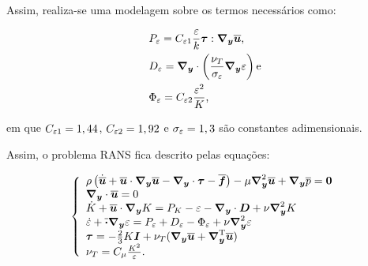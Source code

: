 Assim, realiza-se uma modelagem sobre os termos necessários como:

\begin{subequations}
    \begin{align}
         & P_\ep=C_{\ep 1}\frac{\ep}{k}\btau:\Ny\BBB{u}\text{,}          \\
         & D_\ep=\Ny\cdot\bigpar{\frac{\nu_T}{\sigma_\ep}\Ny\ep}\text{e} \\
         & \Phi_\ep=C_{\ep 2}\frac{\ep^2}{K}\text{,}
    \end{align}
\end{subequations}

\noindent em que $C_{\ep 1}=1,44$, $C_{\ep 2}=1,92$ e $\sigma_\ep=1,3$ são constantes adimensionais.

Assim, o problema RANS fica descrito pelas equações:

\begin{equation}
    \left\{
    \begin{array}{l}
        \rho\bigpar{\dot{\BBB{u}}+\BBB{u}\cdot\Ny\BBB{u}-\Ny\cdot\btau-\BBB{f}}-\mu\Lapl\BBB{u}+\Ny\bar{p}=\BB{0} \\
        \Ny\cdot\BBB{u}=0                                                                                         \\
        \dot{K}+\BBB{u}\cdot\Ny K=P_K-\varepsilon-\Ny\cdot\BB{D}+\nu\Lapl K                                       \\
        \dot{\varepsilon}+\BBB\cdot\Ny\ep=P_\ep+D_\ep-\Phi_\ep+\nu\Lapl\ep                                        \\
        \btau=-\frac{2}{3}K\BB{I}+\nu_T(\Ny\BBB{u}+\NyT\BBB{u})                                                   \\
        \nu_T=C_\mu\frac{K^2}{\ep}\text{.}
    \end{array}
    \right.
\end{equation}